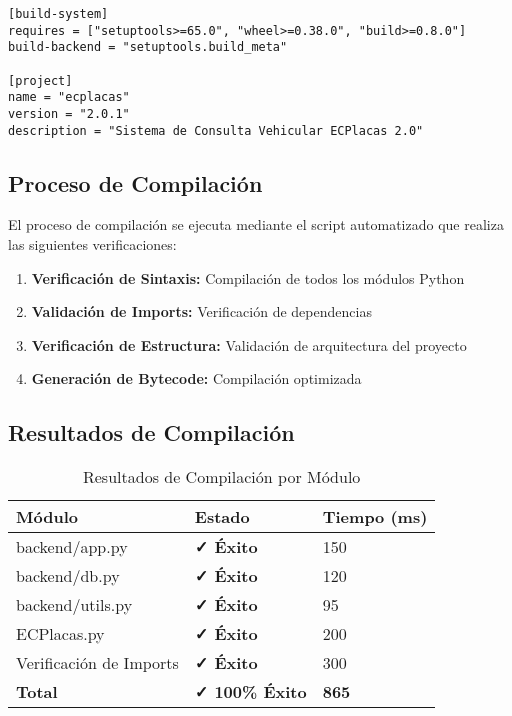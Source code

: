 \documentclass[12pt,a4paper]{article}
\begin{document}
\begin{verbatim}
[build-system]
requires = ["setuptools>=65.0", "wheel>=0.38.0", "build>=0.8.0"]
build-backend = "setuptools.build_meta"

[project]
name = "ecplacas"
version = "2.0.1"
description = "Sistema de Consulta Vehicular ECPlacas 2.0"
\end{verbatim}

\subsection{Proceso de Compilación}

El proceso de compilación se ejecuta mediante el script automatizado que realiza las siguientes verificaciones:

\begin{enumerate}
    \item \textbf{Verificación de Sintaxis:} Compilación de todos los módulos Python
    \item \textbf{Validación de Imports:} Verificación de dependencias
    \item \textbf{Verificación de Estructura:} Validación de arquitectura del proyecto
    \item \textbf{Generación de Bytecode:} Compilación optimizada
\end{enumerate}

\subsection{Resultados de Compilación}

\begin{table}[h]
\centering
\begin{tabularx}{\textwidth}{|X|X|X|}
\hline
\textbf{Módulo} & \textbf{Estado} & \textbf{Tiempo (ms)} \\
\hline
backend/app.py & \textcolor{epngreen}{\textbf{✓ Éxito}} & 150 \\
\hline
backend/db.py & \textcolor{epngreen}{\textbf{✓ Éxito}} & 120 \\
\hline
backend/utils.py & \textcolor{epngreen}{\textbf{✓ Éxito}} & 95 \\
\hline
ECPlacas.py & \textcolor{epngreen}{\textbf{✓ Éxito}} & 200 \\
\hline
Verificación de Imports & \textcolor{epngreen}{\textbf{✓ Éxito}} & 300 \\
\hline
\textbf{Total} & \textcolor{epngreen}{\textbf{✓ 100\% Éxito}} & \textbf{865} \\
\hline
\end{tabularx}
\caption{Resultados de Compilación por Módulo}
\end{table}
\end{document}
